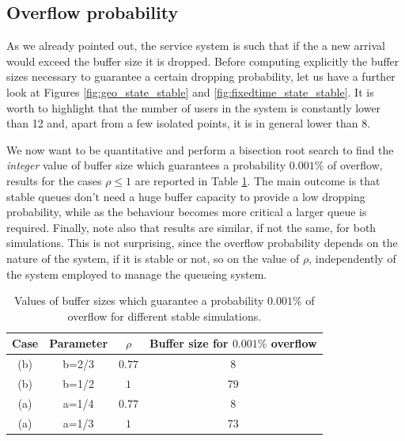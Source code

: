 \documentclass[twoside,onecolumn]{article}
\theoremstyle{definition}
\begin{document}
\subsection{Overflow probability}
As we already pointed out, the service system is such that if the a new arrival would exceed the buffer size it is dropped. Before computing explicitly the buffer sizes necessary to guarantee a certain dropping probability, let us have a further look at Figures \ref{fig:geo_state_stable} and \ref{fig:fixedtime_state_stable}. It is worth to highlight that the number of users in the system is constantly lower than 12 and, apart from a few isolated points, it is in general lower than 8.  

We now want to be quantitative and perform a bisection root search to find the \textit{integer} value of buffer size which guarantees a probability $0.001\%$ of overflow, results for the cases $\rho\leq1$ are reported in Table \ref{tab:overflow}. The main outcome is that stable queues don't need a huge buffer capacity to provide a low dropping probability, while as the behaviour becomes more critical a larger queue is required. Finally, note also that results are similar, if not the same, for both simulations. This is not surprising, since the overflow probability depends on the nature of the system, if it is stable or not, so on the value of $\rho$, independently of the system employed to manage the queueing system.

\begin{table}\centering
\begin{tabular}{c|c|c|c}
Case&Parameter     &  $\rho$   & Buffer size for $0.001\%$ overflow \\ \hline
(b) & b=2/3& $ 0.77$ & 8                                  \\
(b) & b=1/2 &$ 1$    & 79                                 \\
(a) & a=1/4& $ 0.77$ & 8                                \\
(a) & a=1/3&$ 1$    & 73                                
\end{tabular}        \caption{Values of buffer sizes which guarantee a probability $0.001\%$ of overflow for different stable simulations. }\label{tab:overflow}
\end{table}
\end{document}
